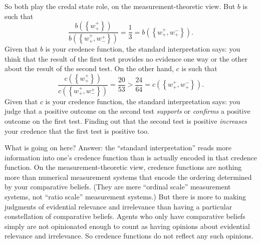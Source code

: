 So both play the credal state role, on the measurement-theoretic view. But $b$ is such that
$$ \frac{b(\left\{w^+_+\right\})}{b(\left\{w^+_+,w^+_-\right\})}=\frac{1}{3} = b(\left\{w^+_+,w^-_+\right\}). $$
Given that $b$ is your credence function, the standard interpretation says: you think that the result of the first test provides no evidence one way or the other about the result of the second test. On the other hand, $c$ is such that
$$ \frac{c(\left\{w^+_+\right\})}{c(\left\{w^+_+,w^+_-\right\})}=\frac{20}{53}>\frac{24}{64} = c(\left\{w^+_+,w^-_+\right\}). $$
Given that $c$ is your credence function, the standard interpretation says: you judge that a positive outcome on the second test \textit{supports} or \textit{confirms} a positive outcome on the first test. Finding out that the second test is positive \textit{increases} your credence that the first test is positive too.

What is going on here? Answer: the ``standard interpretation'' reads more information into one's credence function than is actually encoded in that credence function. On the measurement-theoretic view, credence functions are nothing more than numerical measurement systems that encode the ordering determined by your comparative beliefs. (They are mere ``ordinal scale'' measurement systems, not ``ratio scale'' measurement systems.) But there is more to making judgments of evidential relevance and irrelevance than having a particular constellation of comparative beliefs. Agents who only have comparative beliefs simply are not opinionated enough to count as having opinions about evidential relevance and irrelevance. So credence functions do not reflect any such opinions.

